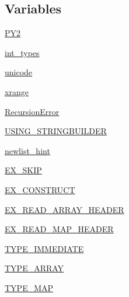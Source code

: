 \subsection*{Variables}
\begin{DoxyCompactItemize}
\item 
\hyperlink{namespacepip_1_1__vendor_1_1msgpack_1_1fallback_a350725aa27580b88fb39505817318eec}{P\+Y2}
\item 
\hyperlink{namespacepip_1_1__vendor_1_1msgpack_1_1fallback_ad1437655758f2990e6845cd74155a05f}{int\+\_\+types}
\item 
\hyperlink{namespacepip_1_1__vendor_1_1msgpack_1_1fallback_a31d64e1650020263c439e352354698af}{unicode}
\item 
\hyperlink{namespacepip_1_1__vendor_1_1msgpack_1_1fallback_a25fe5239944dc61c77a2abfb6c69859f}{xrange}
\item 
\hyperlink{namespacepip_1_1__vendor_1_1msgpack_1_1fallback_abec6fc2a5ece96879b13ed43184fef89}{Recursion\+Error}
\item 
\hyperlink{namespacepip_1_1__vendor_1_1msgpack_1_1fallback_a7cf99c1564fcccf36f0ee6d2c3873005}{U\+S\+I\+N\+G\+\_\+\+S\+T\+R\+I\+N\+G\+B\+U\+I\+L\+D\+ER}
\item 
\hyperlink{namespacepip_1_1__vendor_1_1msgpack_1_1fallback_a4d89f261c9d85d1fc6b1d5c1770d34b4}{newlist\+\_\+hint}
\item 
\hyperlink{namespacepip_1_1__vendor_1_1msgpack_1_1fallback_a3f07fded5f367015db90815e45b21359}{E\+X\+\_\+\+S\+K\+IP}
\item 
\hyperlink{namespacepip_1_1__vendor_1_1msgpack_1_1fallback_a17b35485e970da06e13325f25caec2b4}{E\+X\+\_\+\+C\+O\+N\+S\+T\+R\+U\+CT}
\item 
\hyperlink{namespacepip_1_1__vendor_1_1msgpack_1_1fallback_a9d54704d35f67c9ca5ea96f8a9bdb6eb}{E\+X\+\_\+\+R\+E\+A\+D\+\_\+\+A\+R\+R\+A\+Y\+\_\+\+H\+E\+A\+D\+ER}
\item 
\hyperlink{namespacepip_1_1__vendor_1_1msgpack_1_1fallback_ae9e5219778addf428952f4e1836ab05b}{E\+X\+\_\+\+R\+E\+A\+D\+\_\+\+M\+A\+P\+\_\+\+H\+E\+A\+D\+ER}
\item 
\hyperlink{namespacepip_1_1__vendor_1_1msgpack_1_1fallback_a3ec85f0d980e6e93933d9005476a8482}{T\+Y\+P\+E\+\_\+\+I\+M\+M\+E\+D\+I\+A\+TE}
\item 
\hyperlink{namespacepip_1_1__vendor_1_1msgpack_1_1fallback_abd95dba7bac0b7b4b75e72aea4554137}{T\+Y\+P\+E\+\_\+\+A\+R\+R\+AY}
\item 
\hyperlink{namespacepip_1_1__vendor_1_1msgpack_1_1fallback_a208dfaaefe3664ee66a4d0e6189c5acb}{T\+Y\+P\+E\+\_\+\+M\+AP}

\end{DoxyCompactItemize}
